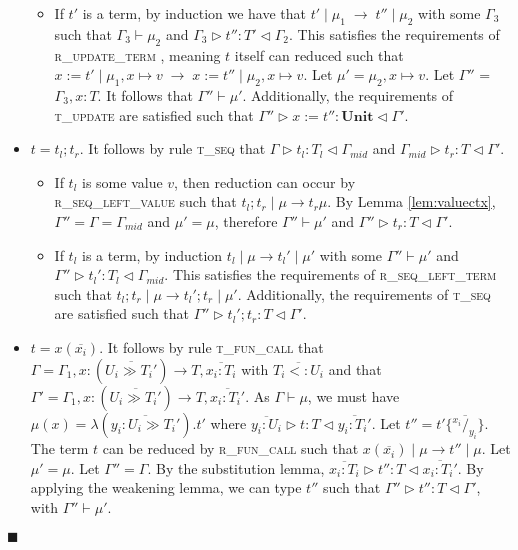 \documentclass{article}
\newcommand{\lemref}[1]{Lemma \ref{#1}}
\newcommand{\rupdt}{\textsc{r\_update\_term} }
\newcommand{\rseqlt}{\textsc{r\_seq\_left\_term} }
\newcommand{\rseqlv}{\textsc{r\_seq\_left\_value} }
\newcommand{\rfunc}{\textsc{r\_fun\_call} }
\newcommand{\tupd}{\textsc{t\_update} }
\newcommand{\tseq}{\textsc{t\_seq} }
\newcommand{\tfunc}{\textsc{t\_fun\_call} }
\newcommand{\typerule}[4]{#1 \triangleright #2 : #3 \triangleleft #4}
\newcommand{\oprule}[4]{#1 \mid #2\;\longrightarrow\;#3 \mid #4}
\newcommand{\subst}[3]{#3 \{\overline{^{#1}/_{#2}}\}}
\newcommand{\unitt}{\mathbf{Unit}}
\newcommand{\qed}{$\blacksquare$}
\newenvironment{proof}{\vspace{1ex}\noindent{\bf Proof}\hspace{0.5em}}
  {\hfill\qed\vspace{1ex}}
\begin{document}
\begin{proof}
\begin{itemize}
\begin{itemize}
	\item If $t'$ is a term, 
	by induction we have that $\oprule{t'}{\mu_1}{t''}{\mu_2}$
	with some $\Gamma_3$ such that $\Gamma_3 \vdash \mu_2$ and
	$\typerule{\Gamma_3}{t''}{T'}{\Gamma_2}$.
	This satisfies the requirements of \rupdt, meaning $t$ itself can reduced
	such that 
	$\oprule{x := t'}{\mu_1, x \mapsto v}{x := t''}{\mu_2, x \mapsto v}$.
	Let $\mu' = \mu_2, x \mapsto v$. Let $\Gamma''$ = $\Gamma_3, x : T$.
	It follows that $\Gamma'' \vdash \mu'$. 
	Additionally, the requirements of \tupd are satisfied such that
	$\typerule{\Gamma''}{x := t''}{\unitt}{\Gamma'}$.
	\end{itemize}

\item $t = t_l ; t_r$. It follows by rule
\tseq that $\typerule{\Gamma}{t_l}{T_l}{\Gamma_{mid}}$ and
$\typerule{\Gamma_{mid}}{t_r}{T}{\Gamma'}$.

	\begin{itemize}
	\item If $t_l$ is some value $v$, then
	reduction can occur by \\ 
	\rseqlv such that
	$t_l; t_r \mid \mu \longrightarrow t_r \mu$. By \lemref{lem:valuectx}, 
	$\Gamma'' = \Gamma = \Gamma_{mid}$
	and $\mu' = \mu$, therefore $\Gamma'' \vdash \mu'$ and 
	$\typerule{\Gamma''}{t_r}{T}{\Gamma'}$.

	\item If $t_l$ is a term, by induction $t_l \mid \mu \longrightarrow t_l' \mid \mu'$
	with some $\Gamma'' \vdash \mu'$ and
	$\typerule{\Gamma''}{t_l'}{T_l}{\Gamma_{mid}}$.
	This satisfies the requirements of \rseqlt
	such that $t_l; t_r \mid \mu \longrightarrow t_l'; t_r \mid \mu'$.
	Additionally, the requirements of \tseq are satisfied such that
	$\typerule{\Gamma''}{t_l'; t_r}{T}{\Gamma'}$.

	\end{itemize}

\item $t = x ( \overline{x_i} )$. It follows by rule \tfunc that
$\Gamma = \Gamma_1, x : (\overline{U_i \gg T_i'}) \rightarrow T, \overline{x_i : T_i}$ 
with $\overline{T_i <: U_i}$ and that
$\Gamma' = \Gamma_1, x : (\overline{U_i \gg T_i'}) \rightarrow T, \overline{x_i : T_i'}$.
As $\Gamma \vdash \mu$, we must have $\mu(x) = \lambda(\overline{y_i : U_i \gg T_i'}).t'$
where $\typerule{\overline{y_i : U_i}}{t}{T}{\overline{y_i : T_i'}}$.
Let $t'' = \subst{x_i}{y_i}{t'} $.
The term $t$ can be reduced by \rfunc such that
$x ( \overline{x_i} ) \mid \mu \longrightarrow t'' \mid \mu$.
Let $\mu' = \mu$. Let $\Gamma'' = \Gamma$. By the substitution lemma, 
$\typerule{\overline{x_i : T_i}}{t''}{T}{\overline{x_i : T_i'}}$.
By applying the weakening lemma, we can type $t''$ such that
$\typerule{\Gamma''}{t''}{T}{\Gamma'}$,
with $\Gamma'' \vdash \mu'$.


\end{itemize}
\end{proof}
\end{document}
